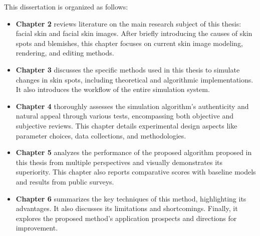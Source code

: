 \begin{spacing}{1.5}
This dissertation is organized as follows:
\begin{itemize}
    \item \textbf{Chapter 2} reviews literature on the main research subject of this thesis: facial skin and facial skin images. After briefly introducing the causes of skin spots and blemishes, this chapter focuses on current skin image modeling, rendering, and editing methods.
    \item \textbf{Chapter 3} discusses the specific methods used in this thesis to simulate changes in skin spots, including theoretical and algorithmic implementations. It also introduces the workflow of the entire simulation system.
    \item \textbf{Chapter 4} thoroughly assesses the simulation algorithm's authenticity and natural appeal through various tests, encompassing both objective and subjective reviews. This chapter details experimental design aspects like parameter choices, data collections, and methodologies.
    \item \textbf{Chapter 5} analyzes the performance of the proposed algorithm proposed in this thesis from multiple perspectives and visually demonstrates its superiority. This chapter also reports comparative scores with baseline models and results from public surveys.
    \item \textbf{Chapter 6} summarizes the key techniques of this method, highlighting its advantages. It also discusses its limitations and shortcomings. Finally, it explores the proposed method's application prospects and directions for improvement.
\end{itemize}

\end{spacing}
\newpage


